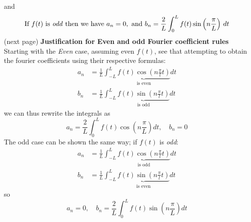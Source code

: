 \documentclass{report}
\begin{document}
and
\begin{equation*}
\text{If }f(t)\text{ is \textit{odd} then we have }a_n=0,\text{ and }b_n=\frac{2}{L}\int^L_0f(t)\sin\left(n\frac{\pi}{L}\right)\,dt
\end{equation*}
(next page)\newpage
\noindent\textbf{Justification for Even and odd Fourier coefficient rules}\\
Starting with the \textit{Even} case, assuming even $f(t)$, see that attempting to obtain the fourier coefficients
using their respective formulas:
\begin{align*}
a_n&=\frac{1}{L}\int^L_{-L}\underbrace{f(t)\cos\left(n\frac{\pi}{l}t\right)}_{\text{is even}}dt\\
b_n&=\frac{1}{L}\int^L_{-L}\underbrace{f(t)\sin\left(n\frac{\pi}{l}t\right)}_{\text{is odd}}dt
\end{align*}
we can thus rewrite the integrals as
\begin{equation*}
a_n=\frac{2}{L}\int^L_0f(t)\cos\left(n\frac{\pi}{L}\right)dt,\quad b_n=0
\end{equation*}
The odd case can be shown the same way; if $f(t)$ is \textit{odd}:
\begin{align*}
a_n&=\frac{1}{L}\int^L_{-L}\underbrace{f(t)\cos\left(n\frac{\pi}{l}t\right)}_{\text{is odd}}dt\\
b_n&=\frac{1}{L}\int^L_{-L}\underbrace{f(t)\sin\left(n\frac{\pi}{l}t\right)}_{\text{is even}}dt
\end{align*}
so
\begin{equation*}
a_n=0,\quad b_n=\frac{2}{L}\int^L_0f(t)\sin\left(n\frac{\pi}{L}\right)dt
\end{equation*}
\newpage
\end{document}
